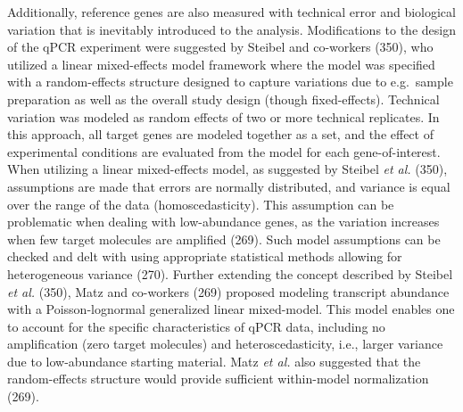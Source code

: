 \documentclass[twoside,10pt]{gihclass} %
\begin{document}
Additionally, reference genes are also measured with technical error and biological variation that is inevitably introduced to the analysis.
Modifications to the design of the qPCR experiment were suggested by Steibel and co-workers (350), who utilized a linear mixed-effects model framework where the model was specified with a random-effects structure designed to capture variations due to e.g.~sample preparation as well as the overall study design (though fixed-effects).
Technical variation was modeled as random effects of two or more technical replicates.
In this approach, all target genes are modeled together as a set, and the effect of experimental conditions are evaluated from the model for each gene-of-interest.
When utilizing a linear mixed-effects model, as suggested by Steibel \emph{et al.} (350), assumptions are made that errors are normally distributed, and variance is equal over the range of the data (homoscedasticity).
This assumption can be problematic when dealing with low-abundance genes, as the variation increases when few target molecules are amplified (269).
Such model assumptions can be checked and delt with using appropriate statistical methods allowing for heterogeneous variance (270).
Further extending the concept described by Steibel \emph{et al.} (350), Matz and co-workers (269) proposed modeling transcript abundance with a Poisson-lognormal generalized linear mixed-model. This model enables one to account for the specific characteristics of qPCR data, including no amplification (zero target molecules) and heteroscedasticity, i.e., larger variance due to low-abundance starting material.
Matz \emph{et al.} also suggested that the random-effects structure would provide sufficient within-model normalization (269).
\end{document}
